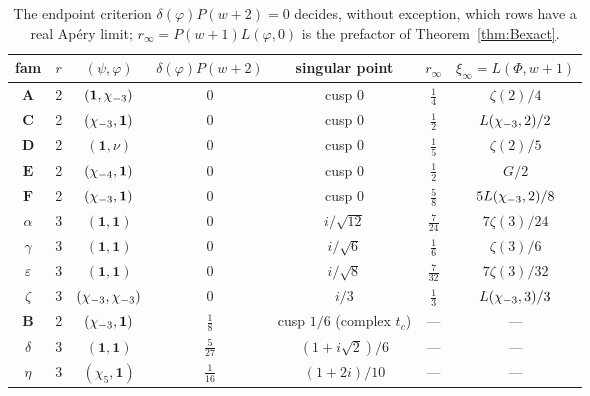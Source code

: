 \begin{table}[t]
\caption{The endpoint criterion $\delta(\varphi)P(w+2)=0$ decides, without
exception, which rows have a real Ap\'ery limit; $r_\infty=P(w+1)L(\varphi,0)$
is the prefactor of Theorem~\ref{thm:Bexact}.
}
\label{tab:thmBexact}
\renewcommand{\arraystretch}{1.2}
\small
\begin{tabular}{@{}c c c c c c c@{}}
\toprule
fam & $r$ & $(\psi,\varphi)$ & $\delta(\varphi)P(w{+}2)$ & singular point &
$r_\infty$ & $\xi_\infty=L(\Phi,w{+}1)$\\
\midrule
$\mathbf A$ & 2 & $(\mathbf 1,\chi_{-3})$ & $0$ & cusp $0$ & $\tfrac14$ & $\zeta(2)/4$\\
$\mathbf C$ & 2 & $(\chi_{-3},\mathbf 1)$ & $0$ & cusp $0$ & $\tfrac12$ & $L(\chi_{-3},2)/2$\\
$\mathbf D$ & 2 & $(\mathbf 1,\nu)$ & $0$ & cusp $0$ & $\tfrac15$ & $\zeta(2)/5$\\
$\mathbf E$ & 2 & $(\chi_{-4},\mathbf 1)$ & $0$ & cusp $0$ & $\tfrac12$ & $G/2$\\
$\mathbf F$ & 2 & $(\chi_{-3},\mathbf 1)$ & $0$ & cusp $0$ & $\tfrac58$ & $5L(\chi_{-3},2)/8$\\
$\alpha$ & 3 & $(\mathbf 1,\mathbf 1)$ & $0$ & $i/\sqrt{12}$ & $\tfrac7{24}$ & $7\zeta(3)/24$\\
$\gamma$ & 3 & $(\mathbf 1,\mathbf 1)$ & $0$ & $i/\sqrt6$ & $\tfrac16$ & $\zeta(3)/6$\\
$\varepsilon$ & 3 & $(\mathbf 1,\mathbf 1)$ & $0$ & $i/\sqrt8$ & $\tfrac7{32}$ & $7\zeta(3)/32$\\
$\zeta$ & 3 & $(\chi_{-3},\chi_{-3})$ & $0$ & $i/3$ & $\tfrac13$ & $L(\chi_{-3},3)/3$\\[2pt]
$\mathbf B$ & 2 & $(\chi_{-3},\mathbf 1)$ & $\tfrac18$ & cusp $1/6$ (complex $t_c$) & --- & ---\\
$\delta$ & 3 & $(\mathbf 1,\mathbf 1)$ & $\tfrac5{27}$ & $(1+i\sqrt2)/6$ & --- & ---\\
$\eta$ & 3 & $(\chi_5,\mathbf 1)$ & $\tfrac1{16}$ & $(1+2i)/10$ & --- & ---\\
\bottomrule
\end{tabular}
\end{table}

